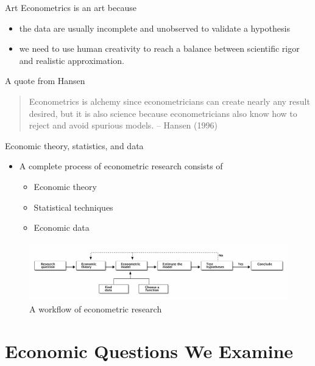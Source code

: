 \documentclass[presentation]{beamer}
\begin{document}
\begin{frame}[label={sec:org3630b27}]{Art}
Econometrics is an art because 
\begin{itemize}
\item the data are usually incomplete and unobserved to validate a
hypothesis
\item we need to use human creativity to reach a balance between
scientific rigor and realistic approximation.
\end{itemize}
\end{frame}

\begin{frame}[label={sec:org830be0b}]{A quote from Hansen}
\begin{quote}
Econometrics is alchemy since econometricians can create nearly any
result desired, but it is also science because econometricians also
know how to reject and avoid spurious models. -- Hansen (1996)
\end{quote}
\end{frame}


\begin{frame}[label={sec:org0bdcef3}]{Economic theory, statistics, and data}
\begin{itemize}
\item A complete process of econometric research consists of
\begin{itemize}
\item Economic theory
\item Statistical techniques
\item Economic data
\end{itemize}
\end{itemize}

\begin{figure}[htbp]
\centering
\includegraphics[width=1.0\textwidth]{figure/econometric_workflow.png}
\caption{\label{fig:org3c89a86}
A workflow of econometric research}
\end{figure}
\end{frame}


\section{Economic Questions We Examine}
\label{sec:orge26a5bc}
\setcounter{tocdepth}{1}
\tableofcontents[currentsection]
\end{document}
